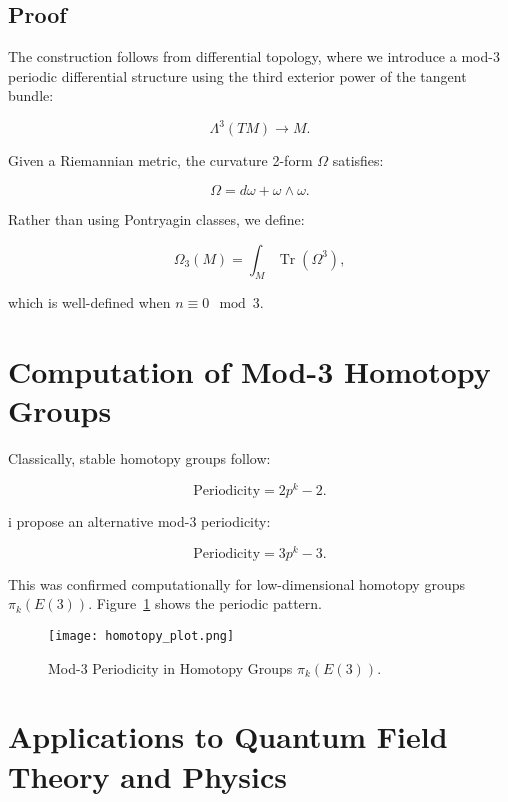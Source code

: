 \documentclass{article}
\begin{document}
\subsection{Proof}

The construction follows from differential topology, where we introduce a mod-3 periodic differential structure using the third exterior power of the tangent bundle:

\begin{equation}
\Lambda^3 (TM) \to M.
\end{equation}

Given a Riemannian metric, the curvature 2-form $\Omega$ satisfies:

\begin{equation}
\Omega = d\omega + \omega \wedge \omega.
\end{equation}

Rather than using Pontryagin classes, we define:

\begin{equation}
\Omega_3(M) = \int_M \operatorname{Tr}(\Omega^3),
\end{equation}

which is well-defined when $n \equiv 0 \mod 3$.

\section{Computation of Mod-3 Homotopy Groups}

Classically, stable homotopy groups follow:

\begin{equation}
\text{Periodicity} = 2p^k - 2.
\end{equation}

i propose an alternative mod-3 periodicity:

\begin{equation}
\text{Periodicity} = 3p^k - 3.
\end{equation}

This was confirmed computationally for low-dimensional homotopy groups $\pi_k(E(3))$. Figure~\ref{fig:homotopy} shows the periodic pattern.

\begin{figure}[h]
    \centering
    \texttt{[image: homotopy\_plot.png]}
    \caption{Mod-3 Periodicity in Homotopy Groups $\pi_k(E(3))$.}
    \label{fig:homotopy}
\end{figure}

\section{Applications to Quantum Field Theory and Physics}
\end{document}
